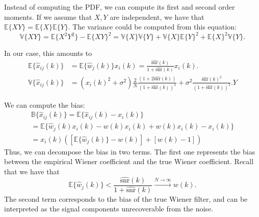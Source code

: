 \documentclass[a4paper,10pt]{article}
\begin{document}
%

Instead of computing the PDF, we can compute its first and second order
moments. If we assume that $X,Y$ are independent, we have that
$\mathbb E\{XY\} = \mathbb E\{X\}\mathbb E\{Y\}$.
The variance could be computed from this equation:
\[\mathbb V\{XY\} = \mathbb E\{X^2Y^2\} - \mathbb E\{XY\}^2 = 
\mathbb V\{X\}\mathbb V\{Y\} +\mathbb V\{X\}\mathbb E\{Y\}^2 + \mathbb E\{X\}^2\mathbb V\{Y\}.\]

In our case, this amounts to
\begin{align*}
	\mathbb E\{\hat x_{ij}(k)\} &= \mathbb E\{\hat w_j(k)\}x_i(k) = \frac{\hat{\text{snr}}(k)}{1 + \hat{\text{snr}}(k)}x_i(k).\\
	\mathbb V\{\hat x_{ij}(k)\} &=  
(x_i(k)^2 + \sigma^2)
\frac{2}N\frac{\left(1 + 2\hat{\text{snr}}(k)\right)}{(1 + \hat{\text{snr}}(k))^4} + 
\sigma^2\frac{\hat{\text{snr}}(k)^2}{(1 + \hat{\text{snr}}(k))^2}.
Y\end{align*}

We can compute the bias:
\begin{multline*}
\mathbb B\{\hat x_{ij}(k)\} = \mathbb E\{\hat x_{ij}(k)-x_i(k)\} \\
= \mathbb E\{\hat w_j(k) x_i(k) - w(k)x_i(k) + w(k)x_i(k) - x_i(k)\}\\
= x_i(k)([\mathbb E\{\hat w_j(k)\} - w(k)] + [w(k) - 1])
\end{multline*}
Thus, we can decompose the bias in two terms. The first one represents the
bias between the empirical Wiener coefficient and the true Wiener coefficient.
Recall that we have that
\[\mathbb E\{\hat w_j(k)\} < \frac{\hat{\text{snr}}(k)}{1 + \hat{\text{snr}}(k)} \xrightarrow{N\to\infty} w(k).\]
The second term corresponds to the bias of the true Wiener filter, and
can be interpreted as the signal components unrecoverable from the noise.
\end{document}
